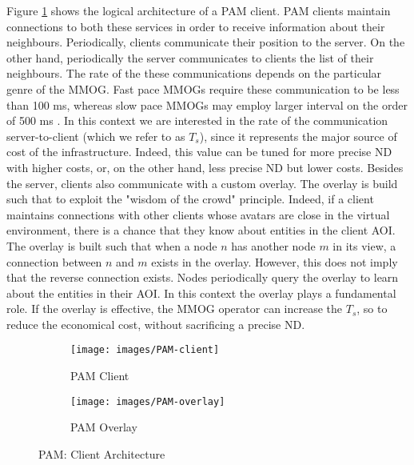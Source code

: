 \documentclass[final,10pt,a5paper]{phdimt}
\theoremstyle{definition}
\begin{document}
Figure \ref{fig:pam-client} shows the logical architecture of a PAM client.
PAM clients maintain connections to both these services in order to receive information about their neighbours. 
Periodically, clients communicate their position to the server.
On the other hand, periodically the server communicates to clients the list of their neighbours.
The rate of the these communications depends on the particular genre of the MMOG.
Fast pace MMOGs require these communication to be less than 100 ms, whereas slow pace MMOGs may employ larger interval on the order of 500 ms \cite{claypool2006latency}.
In this context we are interested in the rate of the communication server-to-client (which we refer to as $T_s$), since it represents the major source of cost of the infrastructure. Indeed, this value can be tuned for more precise ND with higher costs, or, on the other hand, less precise ND but lower costs. 
Besides the server, clients also communicate with a custom overlay.
The overlay is build such that to exploit the "wisdom of the crowd" principle.
Indeed, if a client maintains connections with other clients whose avatars are close in the virtual environment, there is a chance that they know about entities in the client AOI.
The overlay is built such that when a node $n$ has another node $m$ in its view, a connection between $n$
and $m$ exists in the overlay. However, this does not imply that the reverse connection exists. 
Nodes periodically query the overlay to learn about the entities in their AOI.
In this context the overlay plays a fundamental role. If the overlay is effective, the MMOG operator can increase the $T_s$, so to reduce the economical cost, without sacrificing a precise ND.



\begin{figure}
        \begin{subfigure}[b]{0.45\textwidth}
                \centering
                \texttt{[image: images/PAM-client]}
                \caption{PAM Client}
                \label{fig:pam-client}
        \end{subfigure}
        \qquad
        \begin{subfigure}[b]{0.45\textwidth}
                \centering
                \texttt{[image: images/PAM-overlay]}
                \caption{PAM Overlay}
                \label{fig:pam-overlay}
        \end{subfigure}
        \caption{PAM: Client Architecture}\label{fig:PAM-client-architecture}
\end{figure}
\end{document}
